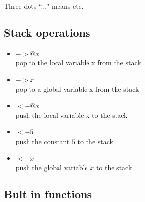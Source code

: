 \documentclass[12pt]{amsart}
\begin{document}
Three dots ``..." means etc. 



\subsection{Stack operations}	
\begin{itemize}	
\item		$-> @ x$\\
		pop to the local variable x from the stack
	
\item				$-> x$\\
		pop to a global variable  x from the stack
		
\item				$<- @ x$\\
		push  the local variable x to the stack
	
\item				$<- 5$\\
		push the constant $5$ to the stack
	
\item				$<- x$\\
		push the global variable $x$ to the stack

\end{itemize}	
\subsection{	Bult in functions}
\end{document}
